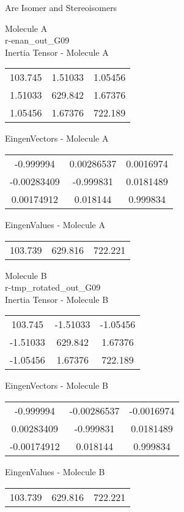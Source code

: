 \begin{center}
\vtab
\vtab
\textcolor{NavyBlue}{\Large Are Isomer and Stereoisomers}
\end{center}
\newpage
\begin{multicols}{2}
\begin{center}
Molecule A \\ 
r-enan\_out\_G09
\\
Inertia Tensor - Molecule A \\
\vtab
\begin{tabular}{|c c c|}
103.745	 & 	1.51033	 & 	1.05456	 \\
1.51033	 & 	629.842	 & 	1.67376	 \\
1.05456	 & 	1.67376	 & 	722.189
\end{tabular}

\vtab
 EingenVectors - Molecule A     \\
\vtab
\begin{tabular}{|c c c|}
-0.999994	 & 	0.00286537	 & 	0.0016974	 \\
-0.00283409	 & 	-0.999831	 & 	0.0181489	 \\
0.00174912	 & 	0.018144	 & 	0.999834
\end{tabular}

\vtab
 EingenValues - Molecule A     \\
\vtab
\begin{tabular}{|c c c|}
103.739	 & 	629.816	 & 	722.221
\end{tabular}
\columnbreak

Molecule B \\ 
r-tmp\_rotated\_out\_G09
\\
Inertia Tensor - Molecule B \\
\vtab
\begin{tabular}{|c c c|}
103.745	 & 	-1.51033	 & 	-1.05456	 \\
-1.51033	 & 	629.842	 & 	1.67376	 \\
-1.05456	 & 	1.67376	 & 	722.189
\end{tabular}

\vtab
 EingenVectors - Molecule B     \\
\vtab
\begin{tabular}{|c c c|}
-0.999994	 & 	-0.00286537	 & 	-0.0016974	 \\
0.00283409	 & 	-0.999831	 & 	0.0181489	 \\
-0.00174912	 & 	0.018144	 & 	0.999834
\end{tabular}

\vtab
 EingenValues - Molecule B     \\
\vtab
\begin{tabular}{|c c c|}
103.739	 & 	629.816	 & 	722.221
\end{tabular}

\end{center}
\end{multicols}
